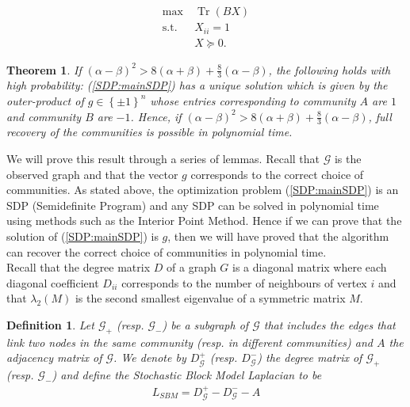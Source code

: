 \documentclass[english]{article}
\newtheorem{definition}{Definition}
\newtheorem{theorem}{Theorem}
\newcommand{\1}{\textbf{1}}
\newcommand{\G}{\mathcal{G}}
\newcommand{\Gp}{\mathcal{G}_+}
\newcommand{\Gm}{\mathcal{G}_-}
\newcommand{\Dp}{D_{\mathcal{G}}^+}
\newcommand{\Dm}{D_{\mathcal{G}}^-}
\newcommand{\tr}{\operatorname{Tr}}
\begin{document}
\begin{align}
\max\ & \tr (BX)\nonumber\\
\text{s.t.}\ &X_{ii}=1\label{SDP:mainSDP}\\
& X\succeq 0.\nonumber
\end{align}

\begin{theorem}\label{theorem:main_SDP_provenintheappendix}
If $(\alpha-\beta)^2 > 8(\alpha+\beta) + \frac83(\alpha-\beta)$, the following holds with high probability:
(\ref{SDP:mainSDP}) has a unique solution which is given by the outer-product of $g\in\left\{\pm1\right\}^n$ whose entries corresponding to community $A$ are $1$ and community $B$ are $-1$. 
Hence, if $(\alpha-\beta)^2 > 8(\alpha+\beta) + \frac83(\alpha-\beta)$, full recovery of the communities is possible in polynomial time.
\end{theorem}

We will prove this result through a series of lemmas. Recall that $\G$ is the observed graph and that the vector $g$ corresponds to the correct choice of communities. As stated above, the optimization problem (\ref{SDP:mainSDP}) is an SDP (Semidefinite Program) and any SDP can be solved in polynomial time using methods such as the Interior Point Method. Hence if we can prove that the solution of (\ref{SDP:mainSDP}) is $g$, then we will have proved that the algorithm can recover the correct choice of communities in polynomial time.\\

Recall that the degree matrix $D$ of a graph $G$ is a diagonal matrix where each diagonal coefficient $D_{ii}$ corresponds to the number of neighbours of vertex $i$ and that $\lambda_2(M)$ is the second smallest eigenvalue of a symmetric matrix $M$. 

\begin{definition}
Let $\Gp$ (resp. $\Gm$) be a subgraph of $\G$ that includes the edges that link two nodes in the same community (resp. in different communities) and $A$ the adjacency matrix of $\G$. We denote by $\Dp$ (resp. $\Dm$) the degree matrix of $\Gp$ (resp. $\Gm$) and define the Stochastic Block Model Laplacian to be 
\begin{align*}
L_{SBM}=\Dp-\Dm-A
\end{align*}
\end{definition}
\end{document}
